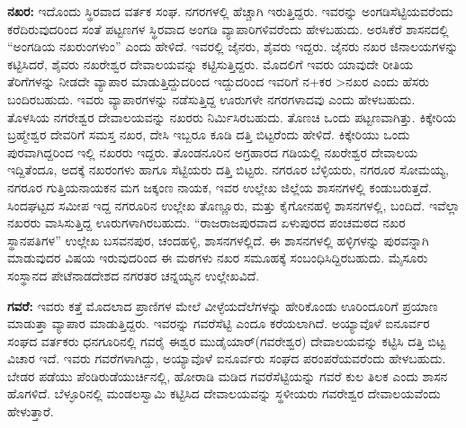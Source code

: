 \textbf{ನಖರ: } ಇದೊಂದು ಸ್ಥಿರವಾದ ವರ್ತಕ ಸಂಘ. ನಗರಗಳಲ್ಲಿ ಹೆಚ್ಚಾಗಿ ಇರುತ್ತಿದ್ದರು. ಇವರನ್ನು ಅಂಗಡಿಸೆಟ್ಟಿಯವರೆಂದು ಕರೆದಿರುವುದರಿಂದ ಸಂತೆ ಪಟ್ಟಣಗಳ ಸ್ಥಿರವಾದ ಅಂಗಡಿ ವ್ಯಾಪಾರಿಗಳಿವರೆಂದು ಹೇಳಬಹುದು. ಅರಸಿಕೆರೆ ಶಾಸನದಲ್ಲಿ “ಅಂಗಡಿಯ ನಖರುಂಗಳುಂ” ಎಂದು ಹೇಳಿದೆ. ಇವರಲ್ಲಿ ಜೈನರು, ಶೈವರು ಇದ್ದರು. ಜೈನರು ನಖರ ಜಿನಾಲಯಗಳನ್ನು ಕಟ್ಟಿಸಿದರೆ, ಶೈವರು ನಖರೇಶ್ವರ ದೇವಾಲಯವನ್ನು ಕಟ್ಟಿಸುತ್ತಿದ್ದರು. ಮೊದಲಿಗೆ ಇವರು ಯಾವುದೇ ರೀತಿಯ ತೆರಿಗೆಗಳನ್ನು ನೀಡದೇ ವ್ಯಾಪಾರ ಮಾಡುತ್ತಿದ್ದುದರಿಂದ ಇದ್ದುದರಿಂದ ಇವರಿಗೆ ನ+ಕರ \textgreater  ನಖರ ಎಂದು ಹೆಸರು ಬಂದಿರಬಹುದು. ಇವರು ವ್ಯಾಪಾರಗಳನ್ನು ನಡೆಸುತ್ತಿದ್ದ ಊರುಗಳೇ ನಗರಗಳಾದವು ಎಂದು ಹೇಳಬಹುದು. ತೊಳಸಿಯ ನಗರೇಶ್ವರ ದೇವಾಲಯವನ್ನು ನಖರರು ನಿರ್ಮಿಸಿರಬಹುದು. ತೊಣಚಿ ಒಂದು ಪಟ್ಟಣವಾಗಿತ್ತು. ಕಿಕ್ಕೇರಿಯ ಬ್ರಹ್ಮೇಶ್ವರ ದೇವರಿಗೆ ಸಮಸ್ತ ನಖರ, ದೇಸಿ ಇಬ್ಬರೂ ಕೂಡಿ ದತ್ತಿ ಬಿಟ್ಟರೆಂದು ಹೇಳಿದೆ. ಕಿಕ್ಕೇರಿಯು ಒಂದು ಪುರವಾಗಿದ್ದರಿಂದ ಇಲ್ಲಿ ನಖರರು ಇದ್ದರು. ತೊಂಡನೂರಿನ ಅಗ್ರಹಾರದ ಗಡಿಯಲ್ಲಿ ನಖರೇಶ್ವರ ದೇವಾಲಯ ಇದ್ದಿತೆಂದೂ, ಅದಕ್ಕೆ ನಖರಂಗಳು ಹಾಗೂ ಸೆಟ್ಟಿಯರು ದತ್ತಿ ಬಿಟ್ಟರು. ನಗರೂರ ಬೆಳ್ಳಿಯರು, ನಗರೂರ ಸೋಮಯ್ಯ, ನಗರೂರ ಗುತ್ತಿಯನಾಯಕನ ಮಗ ಜಕ್ಕಂಣ ನಾಯಕ, ಇವರ ಉಲ್ಲೇಖ ಜಿಲ್ಲೆಯ ಶಾಸನಗಳಲ್ಲಿ ಕಂಡುಬರುತ್ತದೆ. ಸಿಂದಘಟ್ಟದ ಸಮೀಪ ಇದ್ದ ನಗರೂರಿನ ಉಲ್ಲೇಖ ತೊಣ್ಣೂರು, ಮತ್ತು ಕೈಗೋನಹಳ್ಳಿ ಶಾಸನಗಳಲ್ಲಿ, ಬಂದಿದೆ. ಇವೆಲ್ಲಾ ನಖರರು ವಾಸಿಸುತ್ತಿದ್ದ ಊರುಗಳಾಗಿರಬಹುದು. “ರಾಜರಾಜಪುರವಾದ ಏಳುಪುರದ ಪಂಚಮಠದ ನಖರ ಸ್ಥಾನಪತಿಗಳ” ಉಲ್ಲೇಖ ಬಸವನಪುರ, ಚಂದಹಳ್ಳಿ, ಶಾಸನಗಳಲ್ಲಿದೆ. ಈ ಶಾಸನಗಳಲ್ಲಿ ಹಳ್ಳಿಗಳನ್ನು ಪುರವನ್ನಾಗಿ ಮಾಡುವುದರ ವಿಷಯ ಇರುವುದರಿಂದ ಈ ಮಠಗಳು ನಖರ ಸಮೂಹಕ್ಕೆ ಸಂಬಂಧಿಸಿದ್ದಿರಬಹುದು. ಮೈಸೂರು ಸಂಸ್ಥಾನದ ಪೇಟೆನಾಡದೇಶದ ನಗರತರ ಚನ್ನಯ್ಯನ ಉಲ್ಲೇಖವಿದೆ. 

\textbf{ಗವರೆ:} ಇವರು ಕತ್ತೆ ಮೊದಲಾದ ಪ್ರಾಣಿಗಳ ಮೇಲೆ ವೀಳ್ಳೆಯದೆಲೆಗಳನ್ನು ಹೇರಿಕೊಂಡು ಊರಿಂದೂರಿಗೆ ಪ್ರಯಾಣ ಮಾಡುತ್ತಾ ವ್ಯಾಪಾರ ಮಾಡುತ್ತಿದ್ದರು. ಇವರನ್ನು ಗವರೆಸೆಟ್ಟಿ ಎಂದೂ ಕರೆಯಲಾಗಿದೆ. ಅಯ್ಯಾವೊಳೆ ಐನೂರ್ವರ ಸಂಘದ ವರ್ತಕರು ಧನಗೂರಿನಲ್ಲಿ ಗವರೈ ಈಶ್ವರ ಮುಡೈಯಾರ್​(ಗವರೇಶ್ವರ) ದೇವಾಲಯವನ್ನು ಕಟ್ಟಿಸಿ ದತ್ತಿ ಬಿಟ್ಟ ವಿಚಾರ ಇದೆ. ಇವರು ಗವರೆಗಳಾಗಿದ್ದು, ಅಯ್ಯಾವೊಳೆ ಐನೂರ್ವರು ಸಂಘದ ಪರಂಪರೆಯವರೆಂದು ಹೇಳಬಹುದು. ಬೇಡರ ಪಡೆಯು ಪೆಂಡಿರುಡೆಯುರ್ಚಿನಲ್ಲಿ, ಹೋರಾಡಿ ಮಡಿದ ಗವರೆಸೆಟ್ಟಿಯನ್ನು ಗವರೆ ಕುಲ ತಿಲಕ ಎಂದು ಶಾಸನ ಹೊಗಳಿದೆ. ಬೆಳ್ಳೂರಿನಲ್ಲಿ ಮಂಡಲಸ್ವಾಮಿ ಕಟ್ಟಿಸಿದ ದೇವಾಲಯವನ್ನು ಸ್ಥಳೀಯರು ಗವರೇಶ್ವರ ದೇವಾಲಯವೆಂದು ಹೇಳುತ್ತಾರೆ. 

